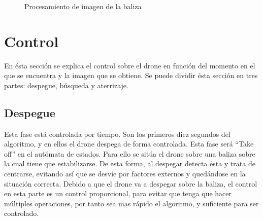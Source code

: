 \begin{figure}[H]
 \centering
 \caption{Procesamiento de imagen de la baliza}
 \label{f:ColorFilterTotal}
\end{figure} 



\section{Control}
\label{sec.control}

\hspace{1 cm} En \'esta secci\'on se explica el control sobre el drone en funci\'on del momento en el que se encuentra y la imagen que se obtiene. Se puede dividir \'esta secci\'on en tres partes:
despegue, b\'usqueda y aterrizaje.


\subsection{Despegue}

\hspace{1 cm} Esta fase est\'a controlada por tiempo. Son los primeros diez segundos del algoritmo, y en ellos el drone despega de forma controlada. Esta fase ser\'a "`Take off"' en el aut\'omata de estados. Para ello se sit\'ua el drone sobre una baliza sobre la cual tiene que estabilizarse. De esta forma, al despegar detecta \'esta y trata de centrarse, evitando as\'i que se desv\'ie por factores externos y qued\'andose en la situaci\'on correcta. Debido a que el drone va a despegar sobre la baliza, el control en esta parte es un control proporcional, para evitar que tenga que hacer m\'ultiples operaciones, por tanto sea mas r\'apido el algoritmo, y suficiente para ser controlado.



